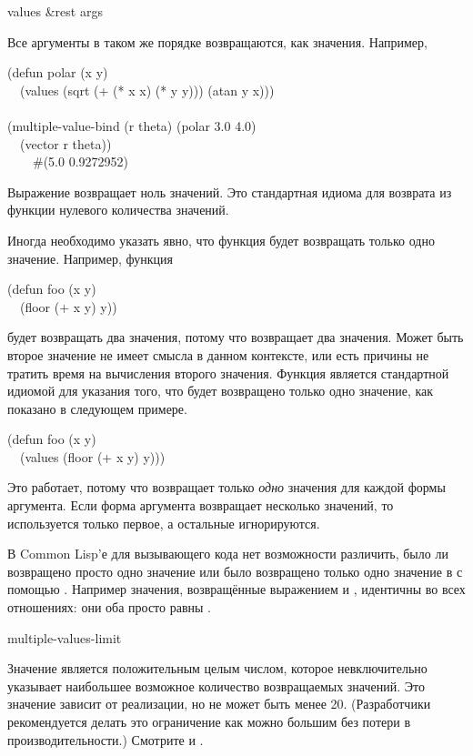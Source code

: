 \begin{defun}[Функция]
values &rest args

Все аргументы в таком же порядке возвращаются, как значения.
Например,
\begin{lisp}
(defun polar (x y) \\
~~(values (sqrt (+ (* x x) (* y y))) (atan y x))) \\
 \\
(multiple-value-bind (r theta) (polar 3.0 4.0) \\
~~(vector r theta)) \\
~~~\EV\ \#(5.0 0.9272952)
\end{lisp}

Выражение  возвращает ноль значений. Это стандартная идиома для
возврата из функции нулевого количества значений.

Иногда необходимо указать явно, что функция будет возвращать только одно
значение. Например, функция
\begin{lisp}
(defun foo (x y) \\
~~(floor (+ x y) y))
\end{lisp}
будет возвращать два значения, потому что  возвращает два
значения. Может быть второе значение не имеет смысла в данном контексте, или
есть причины не тратить время на вычисления второго значения. Функция
 является стандартной идиомой для указания того, что будет
возвращено только одно значение, как показано в следующем примере.
\begin{lisp}
(defun foo (x y) \\
~~(values (floor (+ x y) y)))
\end{lisp}
Это работает, потому что  возвращает только \emph{одно} значения для
каждой формы аргумента. Если форма аргумента возвращает несколько значений, то
используется только первое, а остальные игнорируются.

В Common Lisp'е для вызывающего кода нет возможности различить, было ли
возвращено просто одно значение или было возвращено только одно значение в с
помощью . Например значения, возвращённые выражением  и 
, идентичны во всех отношениях: они оба просто равны .
\end{defun}

\begin{defun}[Константа]
multiple-values-limit

Значение  является положительным целым числом,
которое невключительно указывает наибольшее возможное количество возвращаемых
значений. Это значение зависит от реализации, но не может быть менее 20.
(Разработчики рекомендуется делать это ограничение как можно большим без потери
в производительности.)
Смотрите  и .
\end{defun}

